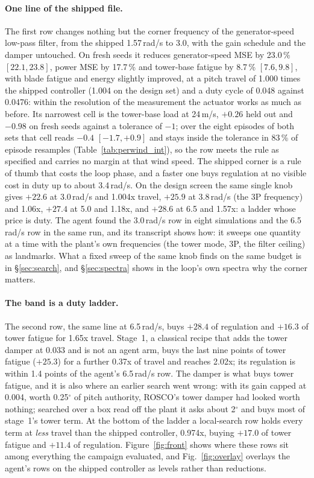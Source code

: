 \documentclass{article}
\begin{document}
\paragraph{One line of the shipped file.} The first row changes nothing but the corner frequency of the generator-speed low-pass filter, from the shipped 1.57\,rad/s to 3.0, with the gain schedule and the damper untouched. On fresh seeds it reduces generator-speed MSE by 23.0\,\% $[22.1, 23.8]$, power MSE by 17.7\,\% and tower-base fatigue by 8.7\,\% $[7.6, 9.8]$, with blade fatigue and energy slightly improved, at a pitch travel of 1.000 times the shipped controller (1.004 on the design set) and a duty cycle of 0.048 against 0.0476: within the resolution of the measurement the actuator works as much as before. Its narrowest cell is the tower-base load at 24\,m/s, $+0.26$ held out and $-0.98$ on fresh seeds against a tolerance of $-1$; over the eight episodes of both sets that cell reads $-0.4$ $[-1.7, +0.9]$ and stays inside the tolerance in 83\,\% of episode resamples (Table~\ref{tab:perwind_int}), so the row meets the rule as specified and carries no margin at that wind speed. The shipped corner is a rule of thumb that costs the loop phase, and a faster one buys regulation at no visible cost in duty up to about 3.4\,rad/s. On the design screen the same single knob gives $+22.6$ at 3.0\,rad/s and 1.004x travel, $+25.9$ at 3.8\,rad/s (the 3P frequency) and 1.06x, $+27.4$ at 5.0 and 1.18x, and $+28.6$ at 6.5 and 1.57x: a ladder whose price is duty. The agent found the 3.0\,rad/s row in eight simulations and the 6.5\,rad/s row in the same run, and its transcript shows how: it sweeps one quantity at a time with the plant's own frequencies (the tower mode, 3P, the filter ceiling) as landmarks. What a fixed sweep of the same knob finds on the same budget is in §\ref{sec:search}, and §\ref{sec:spectra} shows in the loop's own spectra why the corner matters.

\paragraph{The band is a duty ladder.} The second row, the same line at 6.5\,rad/s, buys $+28.4$ of regulation and $+16.3$ of tower fatigue for 1.65x travel. Stage~1, a classical recipe that adds the tower damper at 0.033 and is not an agent arm, buys the last nine points of tower fatigue ($+25.3$) for a further 0.37x of travel and reaches 2.02x; its regulation is within 1.4 points of the agent's 6.5\,rad/s row. The damper is what buys tower fatigue, and it is also where an earlier search went wrong: with its gain capped at 0.004, worth 0.25$^\circ$ of pitch authority, ROSCO's tower damper had looked worth nothing; searched over a box read off the plant it asks about 2$^\circ$ and buys most of stage~1's tower term. At the bottom of the ladder a local-search row holds every term at \emph{less} travel than the shipped controller, 0.974x, buying $+17.0$ of tower fatigue and $+11.4$ of regulation. Figure~\ref{fig:front} shows where these rows sit among everything the campaign evaluated, and Fig.~\ref{fig:overlay} overlays the agent's rows on the shipped controller as levels rather than reductions.
\end{document}

